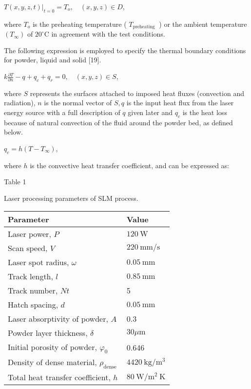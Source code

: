 \documentclass[10pt]{article}
\begin{document}
$\left.T(x, y, z, t)\right|_{t=0}=T_{o}, \quad(x, y, z) \in D$,

where $T_{o}$ is the preheating temperature ( $T_{\text {preheating }}$ ) or the ambient temperature $\left(T_{\infty}\right)$ of $20^{\circ} \mathrm{C}$ in agreement with the test conditions.

The following expression is employed to specify the thermal boundary conditions for powder, liquid and solid [19].

$k \frac{\partial T}{\partial n}-q+q_{c}+q_{r}=0, \quad(x, y, z) \in S$,

where $S$ represents the surfaces attached to imposed heat fluxes (convection and radiation), $n$ is the normal vector of $S, q$ is the input heat flux from the laser energy source with a full description of $q$ given later and $q_{c}$ is the heat loss because of natural convection of the fluid around the powder bed, as defined below.

$q_{c}=h\left(T-T_{\infty}\right)$,

where $h$ is the convective heat transfer coefficient, and can be expressed as:

Table 1

Laser processing parameters of SLM process.

\begin{center}
\begin{tabular}{ll}
\hline
Parameter & Value \\
\hline
Laser power, $P$ & $120 \mathrm{~W}$ \\
Scan speed, $V$ & $220 \mathrm{~mm} / \mathrm{s}$ \\
Laser spot radius, $\omega$ & $0.05 \mathrm{~mm}$ \\
Track length, $l$ & $0.85 \mathrm{~mm}$ \\
Track number, $N t$ & 5 \\
Hatch spacing, $d$ & $0.05 \mathrm{~mm}$ \\
Laser absorptivity of powder, $A$ & 0.3 \\
Powder layer thickness, $\delta$ & $30 \mu \mathrm{m}$ \\
Initial porosity of powder, $\varphi_{0}$ & 0.646 \\
Density of dense material, $\rho_{\text {dense }}$ & $4420 \mathrm{~kg} / \mathrm{m}^{3}$ \\
Total heat transfer coefficient, $h$ & $80 \mathrm{~W} / \mathrm{m}^{2} \mathrm{~K}$ \\
\hline
\end{tabular}
\end{center}
\end{document}
